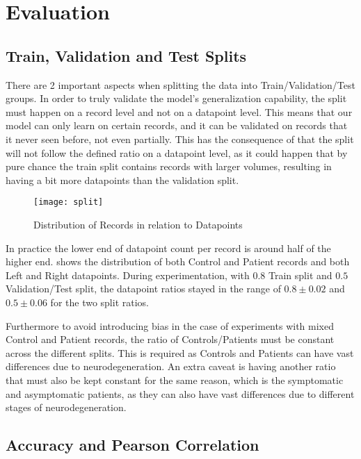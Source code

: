 \section{Evaluation}

\subsection{Train, Validation and Test Splits}
\label{sec:travaltes}

There are 2 important aspects when splitting the data into Train/Validation/Test groups. In order to truly validate the model's generalization capability, the split must happen on a record level and not on a datapoint level. This means that our model can only learn on certain records, and it can be validated on records that it never seen before, not even partially. This has the consequence of that the split will not follow the defined ratio on a datapoint level, as it could happen that by pure chance the train split contains records with larger volumes, resulting in having a bit more datapoints than the validation split.
\begin{figure}[H]
\centering
\texttt{[image: split]}
\caption{Distribution of Records in relation to Datapoints}
\label{fig:hist_split}
\end{figure}
In practice the lower end of datapoint count per record is around half of the higher end.  shows the distribution of both Control and Patient records and both Left and Right datapoints. During experimentation, with $0.8$ Train split and $0.5$ Validation/Test split, the datapoint ratios stayed in the range of $0.8\pm0.02$ and $0.5\pm0.06$ for the two split ratios.\par
Furthermore to avoid introducing bias in the case of experiments with mixed Control and Patient records, the ratio of Controls/Patients must be constant across the different splits. This is required as Controls and Patients can have vast differences due to neurodegeneration. An extra caveat is having another ratio that must also be kept constant for the same reason, which is the symptomatic and asymptomatic patients, as they can also have vast differences due to different stages of neurodegeneration.

\subsection{Accuracy and Pearson Correlation}
\label{sec:eval}

